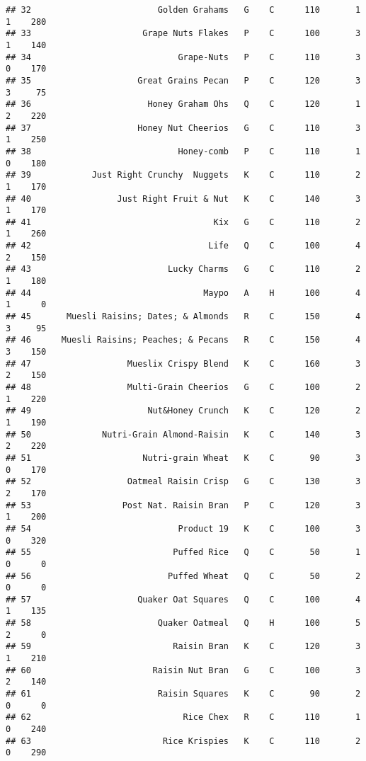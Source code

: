 \documentclass[
]{article}
\begin{document}
\begin{verbatim}
## 32                         Golden Grahams   G    C      110       1   1    280
## 33                      Grape Nuts Flakes   P    C      100       3   1    140
## 34                             Grape-Nuts   P    C      110       3   0    170
## 35                     Great Grains Pecan   P    C      120       3   3     75
## 36                       Honey Graham Ohs   Q    C      120       1   2    220
## 37                     Honey Nut Cheerios   G    C      110       3   1    250
## 38                             Honey-comb   P    C      110       1   0    180
## 39            Just Right Crunchy  Nuggets   K    C      110       2   1    170
## 40                 Just Right Fruit & Nut   K    C      140       3   1    170
## 41                                    Kix   G    C      110       2   1    260
## 42                                   Life   Q    C      100       4   2    150
## 43                           Lucky Charms   G    C      110       2   1    180
## 44                                  Maypo   A    H      100       4   1      0
## 45       Muesli Raisins; Dates; & Almonds   R    C      150       4   3     95
## 46      Muesli Raisins; Peaches; & Pecans   R    C      150       4   3    150
## 47                   Mueslix Crispy Blend   K    C      160       3   2    150
## 48                   Multi-Grain Cheerios   G    C      100       2   1    220
## 49                       Nut&Honey Crunch   K    C      120       2   1    190
## 50              Nutri-Grain Almond-Raisin   K    C      140       3   2    220
## 51                      Nutri-grain Wheat   K    C       90       3   0    170
## 52                   Oatmeal Raisin Crisp   G    C      130       3   2    170
## 53                  Post Nat. Raisin Bran   P    C      120       3   1    200
## 54                             Product 19   K    C      100       3   0    320
## 55                            Puffed Rice   Q    C       50       1   0      0
## 56                           Puffed Wheat   Q    C       50       2   0      0
## 57                     Quaker Oat Squares   Q    C      100       4   1    135
## 58                         Quaker Oatmeal   Q    H      100       5   2      0
## 59                            Raisin Bran   K    C      120       3   1    210
## 60                        Raisin Nut Bran   G    C      100       3   2    140
## 61                         Raisin Squares   K    C       90       2   0      0
## 62                              Rice Chex   R    C      110       1   0    240
## 63                          Rice Krispies   K    C      110       2   0    290

\end{verbatim}
\end{document}
